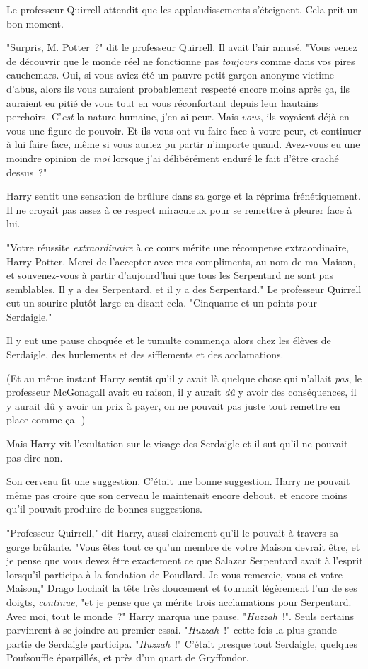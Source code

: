 Le professeur Quirrell attendit que les applaudissements s'éteignent. Cela prit un bon moment.

"Surpris, M. Potter~?" dit le professeur Quirrell. Il avait l'air amusé. "Vous venez de découvrir que le monde réel ne fonctionne pas \emph{toujours} comme dans vos pires cauchemars. Oui, si vous aviez été un pauvre petit garçon anonyme victime d'abus, alors ils vous auraient probablement respecté encore moins après ça, ils auraient eu pitié de vous tout en vous réconfortant depuis leur hautains perchoirs. C'\emph{est} la nature humaine, j'en ai peur. Mais \emph{vous}, ils voyaient déjà en vous une figure de pouvoir. Et ils vous ont vu faire face à votre peur, et continuer à lui faire face, même si vous auriez pu partir n'importe quand. Avez-vous eu une moindre opinion de \emph{moi} lorsque j'ai délibérément enduré le fait d'être craché dessus~?"

Harry sentit une sensation de brûlure dans sa gorge et la réprima frénétiquement. Il ne croyait pas assez à ce respect miraculeux pour se remettre à pleurer face à lui.

"Votre réussite \emph{extraordinaire} à ce cours mérite une récompense extraordinaire, Harry Potter. Merci de l'accepter avec mes compliments, au nom de ma Maison, et souvenez-vous à partir d'aujourd'hui que tous les Serpentard ne sont pas semblables. Il y a des Serpentard, et il y a des Serpentard." Le professeur Quirrell eut un sourire plutôt large en disant cela. "Cinquante-et-un points pour Serdaigle."

Il y eut une pause choquée et le tumulte commença alors chez les élèves de Serdaigle, des hurlements et des sifflements et des acclamations.

(Et au même instant Harry sentit qu'il y avait là quelque chose qui n'allait \emph{pas}, le professeur McGonagall avait eu raison, il y aurait \emph{dû} y avoir des conséquences, il y aurait dû y avoir un prix à payer, on ne pouvait pas juste tout remettre en place comme ça -)

Mais Harry vit l'exultation sur le visage des Serdaigle et il sut qu'il ne pouvait pas dire non.

Son cerveau fit une suggestion. C'était une bonne suggestion. Harry ne pouvait même pas croire que son cerveau le maintenait encore debout, et encore moins qu'il pouvait produire de bonnes suggestions.

"Professeur Quirrell," dit Harry, aussi clairement qu'il le pouvait à travers sa gorge brûlante. "Vous êtes tout ce qu'un membre de votre Maison devrait être, et je pense que vous devez être exactement ce que Salazar Serpentard avait à l'esprit lorsqu'il participa à la fondation de Poudlard. Je vous remercie, vous et votre Maison," Drago hochait la tête très doucement et tournait légèrement l'un de ses doigts, \emph{continue}, "et je pense que ça mérite trois acclamations pour Serpentard. Avec moi, tout le monde~?" Harry marqua une pause. "\emph{Huzzah}~!". Seuls certains parvinrent à se joindre au premier essai. "\emph{Huzzah}~!" cette fois la plus grande partie de Serdaigle participa. "\emph{Huzzah}~!" C'était presque tout Serdaigle, quelques Poufsouffle éparpillés, et près d'un quart de Gryffondor.

